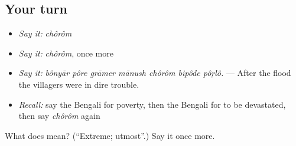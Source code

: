 \subsection*{Your turn}
\begin{itemize}
\raggedright
  \item \emph{Say it:} \emph{chôrôm}
  \item \emph{Say it:} \emph{chôrôm}, once more
  \item \emph{Say it:} \emph{bônyār pôre grāmer mānush chôrôm bipôde pôṛlô.} — After the flood the villagers were in dire trouble.
  \item \emph{Recall:} say the Bengali for poverty, then the Bengali for to be devastated, then say \emph{chôrôm} again
\end{itemize}

\begin{tcolorbox}[breakable,colback=teal!4,colframe=teal!35!black,title={Before you move on}]
What does  mean? (\textquotedblleft{}Extreme; utmost\textquotedblright{}.) Say it once more.
\end{tcolorbox}
